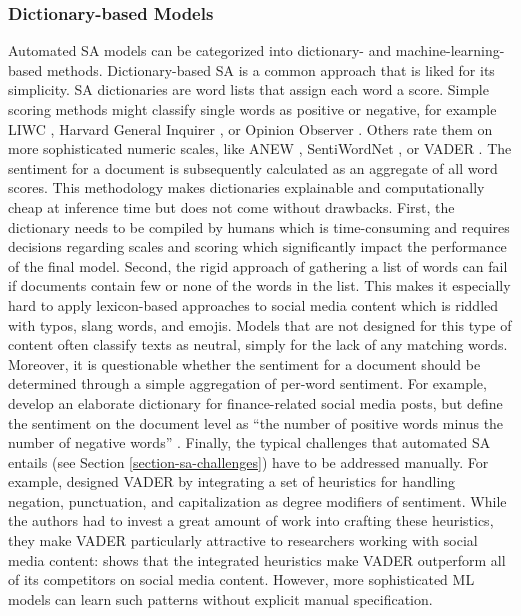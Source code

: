 \subsubsection{Dictionary-based Models}
\label{section-dict-based}
Automated SA models can be categorized into dictionary- and machine-learning-based methods. Dictionary-based SA is a common approach that is liked for its simplicity. SA dictionaries are word lists that assign each word a score. Simple scoring methods might classify single words as positive or negative, for example LIWC , Harvard General Inquirer , or Opinion Observer . Others rate them on more sophisticated numeric scales, like ANEW , SentiWordNet , or VADER . The sentiment for a document is subsequently calculated as an aggregate of all word scores. This methodology makes dictionaries explainable and computationally cheap at inference time but does not come without drawbacks. First, the dictionary needs to be compiled by humans which is time-consuming and requires decisions regarding scales and scoring which significantly impact the performance of the final model. Second, the rigid approach of gathering a list of words can fail if documents contain few or none of the words in the list. This makes it especially hard to apply lexicon-based approaches to social media content which is riddled with typos, slang words, and emojis. Models that are not designed for this type of content often classify texts as neutral, simply for the lack of any matching words. Moreover, it is questionable whether the sentiment for a document should be determined through a simple aggregation of per-word sentiment. For example,  develop an elaborate dictionary for finance-related social media posts, but define the sentiment on the document level as ``the number of positive words minus the number of negative words'' \cite[p.~42]{chen2018ntusd}. Finally, the typical challenges that automated SA entails (see Section \ref{section-sa-challenges}) have to be addressed manually. For example,  designed VADER by integrating a set of heuristics for handling negation, punctuation, and capitalization as degree modifiers of sentiment. While the authors had to invest a great amount of work into crafting these heuristics, they make VADER particularly attractive to researchers working with social media content:  shows that the integrated heuristics make VADER outperform all of its competitors on social media content. However, more sophisticated ML models can learn such patterns without explicit manual specification.

